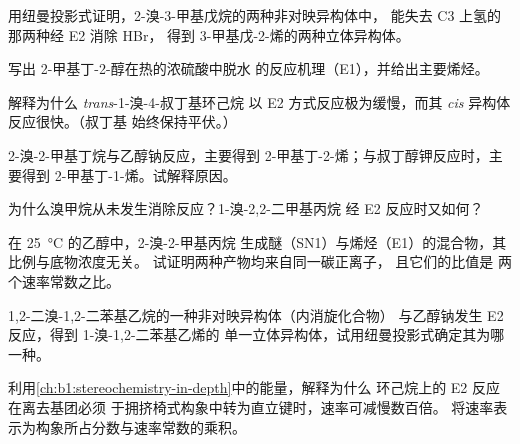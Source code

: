 \begin{exercise}[$\star\star$]\label{exo:b1:elimination:5}
用纽曼投影式证明，2-溴-3-甲基戊烷的两种非对映异构体中，
能失去 C3 上氢的那两种经 E2 消除 HBr，
得到 3-甲基戊-2-烯的两种立体异构体。
\end{exercise}

\begin{exercise}[$\star\star$]\label{exo:b1:elimination:6}
写出 2-甲基丁-2-醇在热的浓硫酸中脱水
的反应机理（E1），并给出主要烯烃。
\end{exercise}

\begin{exercise}[$\star\star$]\label{exo:b1:elimination:7}
解释为什么 \textit{trans}-1-溴-4-叔丁基环己烷
以 E2 方式反应极为缓慢，而其 \textit{cis} 异构体反应很快。（叔丁基
始终保持平伏。）
\end{exercise}

\begin{exercise}[$\star\star$]\label{exo:b1:elimination:8}
2-溴-2-甲基丁烷与乙醇钠反应，主要得到
2-甲基丁-2-烯；与叔丁醇钾反应时，主要得到
2-甲基丁-1-烯。试解释原因。
\end{exercise}

\begin{exercise}[$\star\star$]\label{exo:b1:elimination:9}
为什么溴甲烷从未发生消除反应？1-溴-2,2-二甲基丙烷
经 E2 反应时又如何？
\end{exercise}

\begin{exercise}[$\star\star\star$]\label{exo:b1:elimination:10}
在 \qty{25}{\celsius} 的乙醇中，2-溴-2-甲基丙烷
生成醚（SN1）与烯烃（E1）的混合物，其比例与底物浓度无关。
试证明两种产物均来自同一碳正离子，
且它们的比值是
两个速率常数之比。
\end{exercise}

\begin{exercise}[$\star\star\star$]\label{exo:b1:elimination:11}
1,2-二溴-1,2-二苯基乙烷的一种非对映异构体（内消旋化合物）
与乙醇钠发生 E2 反应，得到 1-溴-1,2-二苯基乙烯的
单一立体异构体，试用纽曼投影式确定其为哪一种。
\end{exercise}

\begin{exercise}[$\star\star\star$]\label{exo:b1:elimination:12}
利用\cref{ch:b1:stereochemistry-in-depth}中的能量，解释为什么
环己烷上的 E2 反应在离去基团必须
于拥挤椅式构象中转为直立键时，速率可减慢数百倍。
将速率表示为构象所占分数与速率常数的乘积。
\end{exercise}

